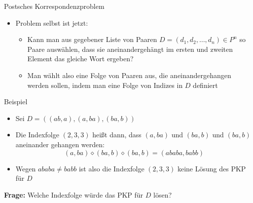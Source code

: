\begin{frame}{Postsches Korrespondenzproblem}
	
	\begin{itemize}
		\item Problem selbst ist jetzt: \begin{itemize}
			\item Kann man aus gegebener Liste von Paaren $D = (d_1, d_2, \dots, d_n) \in P^{n}$ so Paare auswählen, dass sie aneinandergehängt im ersten und zweiten Element das gleiche Wort ergeben?
		\item Man wählt also eine Folge von Paaren aus, die aneinandergehangen werden sollen, indem man eine Folge von Indizes in $D$ definiert
		\end{itemize}
	\end{itemize}

	\pause

	\begin{exampleblock}{Beispiel}
	\begin{itemize}
		\item Sei $D = ((ab,a), (a, ba), (ba, b))$
		\item Die Indexfolge $(2,3,3)$ heißt dann, dass $(a, ba)$ und $(ba,b)$ und $(ba,b)$ aneinander gehangen werden: \[ (a,ba) \diamond (ba,b) \diamond (ba,b) = (ababa, babb) \]
		\item Wegen $ababa \ne babb$ ist also die Indexfolge $(2,3,3)$ keine Lösung des PKP für $D$
	\end{itemize}
	\pause
	\textbf{Frage:} Welche Indexfolge würde das PKP für $D$ lösen?
		
	\end{exampleblock}

\end{frame}

